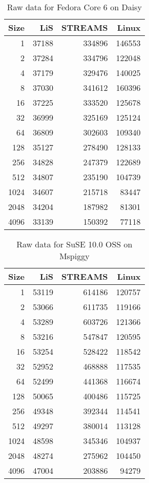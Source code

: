 \documentclass[letterpaper,final,notitlepage,twocolumn,10pt,twoside]{article}
\begin{document}
\begin{appendix}
\begin{table}[hp]
\footnotesize
\center\begin{tabular}{rrrr}\\
\hline
Size & LiS & STREAMS & Linux\\
\hline
\hline
1 & 37188 & 334896 & 146553\\
2 & 37284 & 334796 & 122048\\
4 & 37179 & 329476 & 140025\\
8 & 37030 & 341612 & 160396\\
16 & 37225 & 333520 & 125678\\
32 & 36999 & 325169 & 125124\\
64 & 36809 & 302603 & 109340\\
128 & 35127 & 278490 & 128133\\
256 & 34828 & 247379 & 122689\\
512 & 34807 & 235190 & 104739\\
1024 & 34607 & 215718 & 83447\\
2048 & 34204 & 187982 & 81301\\
4096 & 33139 & 150392 & 77118\\
\hline
\end{tabular}
\caption{Raw data for Fedora Core 6 on Daisy}
\label{table:smpdata}
\normalsize
\end{table}

\begin{table}[hp]
\footnotesize
\center\begin{tabular}{rrrr}\\
\hline
Size & LiS & STREAMS & Linux\\
\hline
\hline
1 & 53119 & 614186 & 120757\\
2 & 53066 & 611735 & 119166\\
4 & 53289 & 603726 & 121366\\
8 & 53216 & 547847 & 120595\\
16 & 53254 & 528422 & 118542\\
32 & 52952 & 468888 & 117535\\
64 & 52499 & 441368 & 116674\\
128 & 50065 & 400486 & 115725\\
256 & 49348 & 392344 & 114541\\
512 & 49297 & 380014 & 113128\\
1024 & 48598 & 345346 & 104937\\
2048 & 48274 & 275962 & 104450\\
4096 & 47004 & 203886 & 94279\\
\hline
\end{tabular}
\caption{Raw data for SuSE 10.0 OSS on Mspiggy}
\label{table:nbdata}
\normalsize
\end{table}

\end{appendix}
\end{document}

